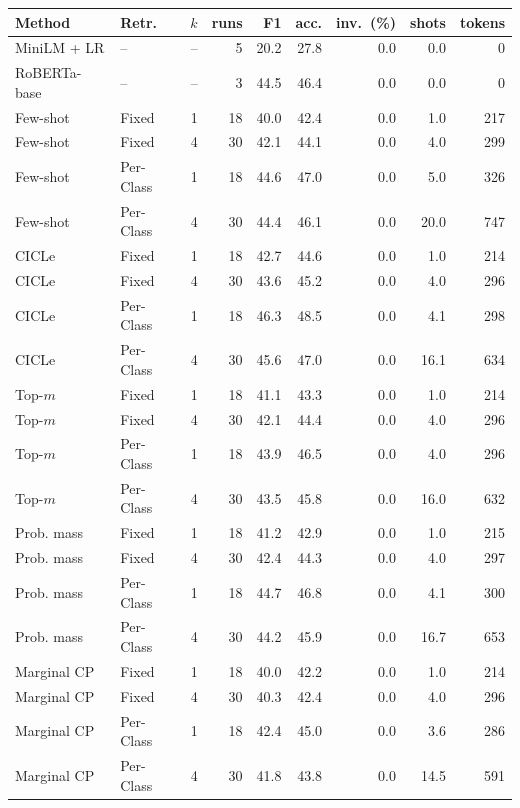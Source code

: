 \begin{tabular}{llrrrrrrr}
\toprule
Method & Retr. & $k$ & runs & F1 & acc. & inv.\ (\%) & shots & tokens \\
\midrule
MiniLM + LR & -- & -- & 5 & 20.2 & 27.8 & 0.0 & 0.0 & 0 \\
RoBERTa-base & -- & -- & 3 & 44.5 & 46.4 & 0.0 & 0.0 & 0 \\
\midrule
Few-shot & Fixed & 1 & 18 & 40.0 & 42.4 & 0.0 & 1.0 & 217 \\
Few-shot & Fixed & 4 & 30 & 42.1 & 44.1 & 0.0 & 4.0 & 299 \\
Few-shot & Per-Class & 1 & 18 & 44.6 & 47.0 & 0.0 & 5.0 & 326 \\
Few-shot & Per-Class & 4 & 30 & 44.4 & 46.1 & 0.0 & 20.0 & 747 \\
CICLe & Fixed & 1 & 18 & 42.7 & 44.6 & 0.0 & 1.0 & 214 \\
CICLe & Fixed & 4 & 30 & 43.6 & 45.2 & 0.0 & 4.0 & 296 \\
CICLe & Per-Class & 1 & 18 & 46.3 & 48.5 & 0.0 & 4.1 & 298 \\
CICLe & Per-Class & 4 & 30 & 45.6 & 47.0 & 0.0 & 16.1 & 634 \\
\midrule
Top-$m$ & Fixed & 1 & 18 & 41.1 & 43.3 & 0.0 & 1.0 & 214 \\
Top-$m$ & Fixed & 4 & 30 & 42.1 & 44.4 & 0.0 & 4.0 & 296 \\
Top-$m$ & Per-Class & 1 & 18 & 43.9 & 46.5 & 0.0 & 4.0 & 296 \\
Top-$m$ & Per-Class & 4 & 30 & 43.5 & 45.8 & 0.0 & 16.0 & 632 \\
Prob. mass & Fixed & 1 & 18 & 41.2 & 42.9 & 0.0 & 1.0 & 215 \\
Prob. mass & Fixed & 4 & 30 & 42.4 & 44.3 & 0.0 & 4.0 & 297 \\
Prob. mass & Per-Class & 1 & 18 & 44.7 & 46.8 & 0.0 & 4.1 & 300 \\
Prob. mass & Per-Class & 4 & 30 & 44.2 & 45.9 & 0.0 & 16.7 & 653 \\
Marginal CP & Fixed & 1 & 18 & 40.0 & 42.2 & 0.0 & 1.0 & 214 \\
Marginal CP & Fixed & 4 & 30 & 40.3 & 42.4 & 0.0 & 4.0 & 296 \\
Marginal CP & Per-Class & 1 & 18 & 42.4 & 45.0 & 0.0 & 3.6 & 286 \\
Marginal CP & Per-Class & 4 & 30 & 41.8 & 43.8 & 0.0 & 14.5 & 591 \\

\end{tabular}
